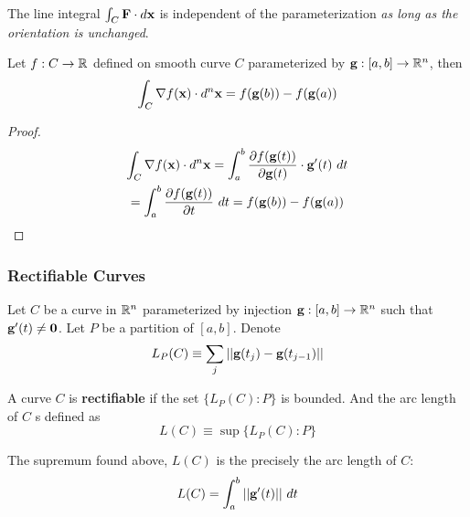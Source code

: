 \documentclass[11pt]{article}
\begin{document}
			\begin{proposition}
				The line integral $\int_C \textbf{F}\cdot d\textbf{x}$ is independent of the parameterization \emph{as long as the orientation is unchanged}.
			\end{proposition}
			
			\begin{theorem}
				Let $f: C \to \mathbb{R}$ defined on smooth curve $C$ parameterized by $\textbf{g}:[a, b] \to \mathbb{R}^n$, then
				\begin{equation}
					\int_C \nabla f(\textbf{x}) \cdot d^n\textbf{x} = f(\textbf{g}(b)) - f(\textbf{g}(a))
				\end{equation}
				\begin{proof}
					\begin{gather}
						\int_C \nabla f(\textbf{x}) \cdot d^n\textbf{x} 
						= \int_a^b \frac{\partial{f(\textbf{g}(t))}}{\partial{\textbf{g}(t)}} \cdot \textbf{g}'(t)\ dt \\
						= \int_a^b \frac{\partial{f(\textbf{g}(t))}}{\partial{t}}\ dt
						= f(\textbf{g}(b)) - f(\textbf{g}(a))
					\end{gather}
				\end{proof}
			\end{theorem}
			
		\subsubsection{Rectifiable Curves}
			\begin{remark}
				Let $C$ be a curve in $\mathbb{R}^n$ parameterized by injection $\textbf{g}: [a, b] \to \mathbb{R}^n$ such that $\textbf{g}'(t) \neq \textbf{0}$. Let $P$ be a partition of $[a, b]$. Denote
				\begin{equation}
					L_P(C) \equiv \sum_{j} ||\textbf{g}(t_j) - \textbf{g}(t_{j-1})||
				\end{equation}
			\end{remark}
			
			\begin{definition}
				A curve $C$ is \textbf{rectifiable} if the set $\{L_P(C):P\}$ is bounded. And the arc length of $C$ s defined as 
				\begin{equation}
					L(C) \equiv \sup \{L_P(C):P\}
				\end{equation}
			\end{definition}
			
			\begin{theorem}
				The supremum found above, $L(C)$ is the precisely the arc length of $C$:
				\begin{equation}
					L(C) = \int_a^b ||\ve{g}'(t)||\ dt
				\end{equation}
			\end{theorem}
		
\end{document}
